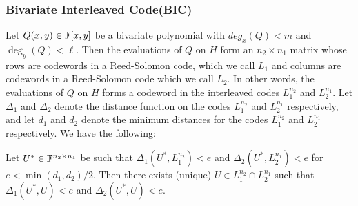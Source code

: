 \subsubsection{Bivariate Interleaved Code(BIC)}
Let $Q(x,y)\in \mathbb{F}[x,y]$ be a bivariate polynomial with $deg_x(Q) < m$ and
$\deg_y(Q) < \ell$. Then the evaluations of $Q$ on $H$ form an $n_2\times n_1$
matrix whose rows are codewords in a Reed-Solomon code, which we call $L_1$ and columns
are codewords in a Reed-Solomon code which we call $L_2$. In other words, the
evaluations of $Q$ on $H$ forms a codeword in the interleaved codes $L_1^{n_2}$
and $L_2^{n_1}$. Let $\Delta_1$ and $\Delta_2$ denote the distance function on
the codes $L_1^{n_2}$ and $L_2^{n_1}$ respectively, and let $d_1$ and $d_2$
denote the minimum distances for the codes $L_1^{n_2}$ and $L_2^{n_1}$
respectively. We have the following:
\begin{lemma}\label{lem:bicdecoding}
Let $U^\ast\in \mathbb{F}^{n_2\times n_1}$ be such that $\Delta_1(U^\ast,L_1^{n_2})<e$
and $\Delta_2(U^\ast,L_2^{n_1})<e$ for $e < \min(d_1,d_2)/2$. Then there exists
(unique) 
$U\in L_1^{n_2}\cap L_2^{n_1}$ such that $\Delta_1(U^\ast,U)<e$ and
$\Delta_2(U^\ast,U)<e$.
\end{lemma}
